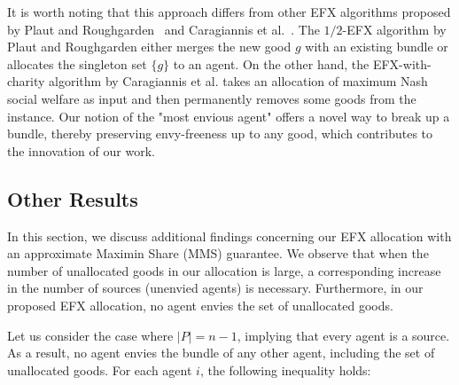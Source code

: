 \documentclass{article}
\begin{document}
It is worth noting that this approach differs from other EFX algorithms proposed by Plaut and Roughgarden~\cite{DBLP:journals/corr/PlautR17} and Caragiannis et al.~\cite{DBLP:journals/corr/abs-1902-04319}. The $1/2$-EFX algorithm by Plaut and Roughgarden either merges the new good $g$ with an existing bundle or allocates the singleton set $\{g\}$ to an agent. On the other hand, the EFX-with-charity algorithm by Caragiannis et al. takes an allocation of maximum Nash social welfare as input and then permanently removes some goods from the instance. Our notion of the "most envious agent" offers a novel way to break up a bundle, thereby preserving envy-freeness up to any good, which contributes to the innovation of our work.

\subsection{Other Results}


In this section, we discuss additional findings concerning our EFX allocation with an approximate Maximin Share (MMS) guarantee. We observe that when the number of unallocated goods in our allocation is large, a corresponding increase in the number of sources (unenvied agents) is necessary. Furthermore, in our proposed EFX allocation, no agent envies the set of unallocated goods.

Let us consider the case where $|P| = n - 1$, implying that every agent is a source. As a result, no agent envies the bundle of any other agent, including the set of unallocated goods. For each agent $i$, the following inequality holds:
\end{document}
